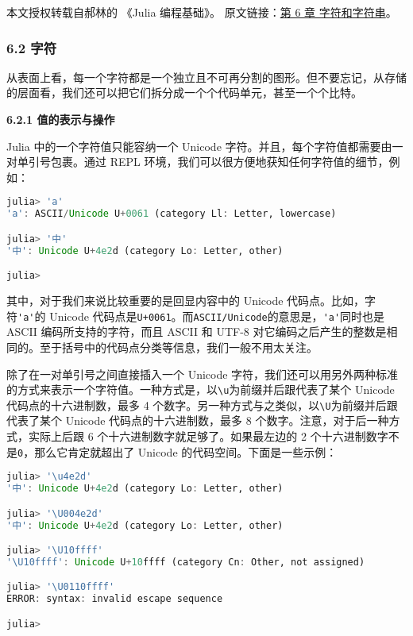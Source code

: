 
本文授权转载自郝林的 《Julia 编程基础》。 原文链接：\href{https://github.com/hyper0x/JuliaBasics/blob/master/book/ch06.md}{第 6 章 字符和字符串}。


\subsubsection{6.2 字符}

从表面上看，每一个字符都是一个独立且不可再分割的图形。但不要忘记，从存储的层面看，我们还可以把它们拆分成一个个代码单元，甚至一个个比特。

\textbf{6.2.1 值的表示与操作}

Julia 中的一个字符值只能容纳一个 Unicode 字符。并且，每个字符值都需要由一对单引号包裹。通过 REPL 环境，我们可以很方便地获知任何字符值的细节，例如：
\begin{lstlisting}[language=julia]
julia> 'a'
'a': ASCII/Unicode U+0061 (category Ll: Letter, lowercase)

julia> '中'
'中': Unicode U+4e2d (category Lo: Letter, other)

julia> 
\end{lstlisting}

其中，对于我们来说比较重要的是回显内容中的 Unicode 代码点。比如，字符\verb|'a'|的 Unicode 代码点是\verb|U+0061|。而\verb|ASCII/Unicode|的意思是，\verb|'a'|同时也是 ASCII 编码所支持的字符，而且 ASCII 和 UTF-8 对它编码之后产生的整数是相同的。至于括号中的代码点分类等信息，我们一般不用太关注。

除了在一对单引号之间直接插入一个 Unicode 字符，我们还可以用另外两种标准的方式来表示一个字符值。一种方式是，以\verb|\u|为前缀并后跟代表了某个 Unicode 代码点的十六进制数，最多 4 个数字。另一种方式与之类似，以\verb|\U|为前缀并后跟代表了某个 Unicode 代码点的十六进制数，最多 8 个数字。注意，对于后一种方式，实际上后跟 6 个十六进制数字就足够了。如果最左边的 2 个十六进制数字不是\verb|0|，那么它肯定就超出了 Unicode 的代码空间。下面是一些示例：
\begin{lstlisting}[language=julia]
julia> '\u4e2d'
'中': Unicode U+4e2d (category Lo: Letter, other)

julia> '\U004e2d'
'中': Unicode U+4e2d (category Lo: Letter, other)

julia> '\U10ffff'
'\U10ffff': Unicode U+10ffff (category Cn: Other, not assigned)

julia> '\U0110ffff'
ERROR: syntax: invalid escape sequence

julia> 
\end{lstlisting}

